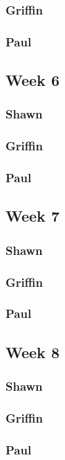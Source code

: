 \documentclass[10pt,draftclsnofoot,onecolumn]{IEEEtran}
\begin{document}
\subsubsection{Griffin}
\subsubsection{Paul}

\subsection{Week 6}
\subsubsection{Shawn}
\subsubsection{Griffin}
\subsubsection{Paul}

\subsection{Week 7}
\subsubsection{Shawn}
\subsubsection{Griffin}
\subsubsection{Paul}

\subsection{Week 8}
\subsubsection{Shawn}
\subsubsection{Griffin}
\subsubsection{Paul}
\end{document}

